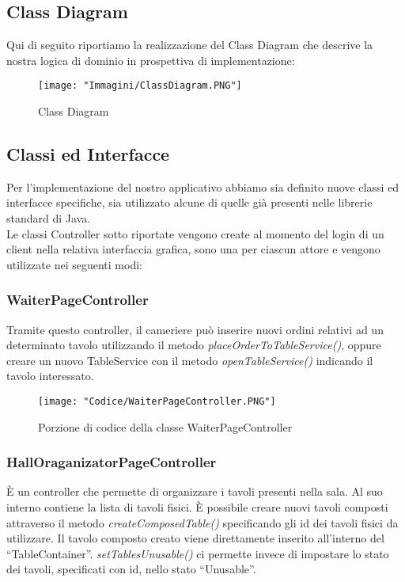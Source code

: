 \documentclass{article}
\begin{document}

\newpage

\subsection{Class Diagram}
Qui di seguito riportiamo la realizzazione del Class Diagram che descrive la nostra logica di dominio in prospettiva di implementazione:

\begin{figure}[!h]
\centering
\texttt{[image: "Immagini/ClassDiagram.PNG"]}
\caption{Class Diagram}
\label{ClassDiagram}
\end{figure}

\newpage

\subsection{Classi ed Interfacce}
Per l'implementazione del nostro applicativo abbiamo sia definito nuove classi ed interfacce specifiche, sia utilizzato alcune di quelle gi\`a presenti nelle librerie standard di Java. \\
Le classi Controller sotto riportate vengono create al momento del login di un client nella relativa interfaccia grafica, sono una per ciascun attore e vengono utilizzate nei seguenti modi: 

\subsubsection{WaiterPageController}

Tramite questo controller, il cameriere pu\`o inserire nuovi ordini relativi ad un determinato tavolo utilizzando il metodo \textit{placeOrderToTableService()}, oppure creare un nuovo TableService con il metodo \textit{openTableService()} indicando il tavolo interessato.

\begin{figure}[!h]
\centering
\texttt{[image: "Codice/WaiterPageController.PNG"]}
\caption{Porzione di codice della classe WaiterPageController}
\end{figure}


\subsubsection{HallOraganizatorPageController}

\`E un controller che permette di organizzare i tavoli presenti nella sala. Al suo interno contiene la lista di tavoli fisici. \`E possibile creare nuovi tavoli composti attraverso il metodo  \textit{createComposedTable()} specificando gli id dei tavoli fisici da utilizzare. Il tavolo composto creato viene direttamente inserito all'interno del ``TableContainer''.
\textit{setTablesUnusable()} ci permette invece di impostare lo stato dei tavoli, specificati con id, nello stato ``Unusable''.
\end{document}
